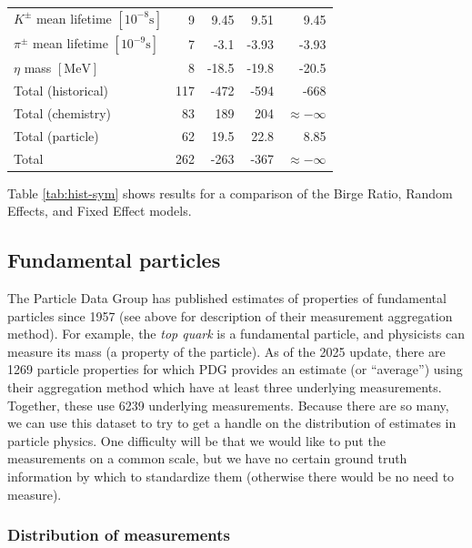 \documentclass[12pt]{article}
\begin{document}
\begin{table}
\begin{tabular}{lrrrr}
  $K^\pm$ mean lifetime $\mathrm{[10^{-8}s]}$ & 9 & 9.45 & 9.51 & 9.45 \\
  $\pi^\pm$ mean lifetime $\mathrm{[10^{-9}s]}$ & 7 & -3.1 & -3.93 & -3.93 \\
  $\eta$ mass $\mathrm{[MeV]}$ & 8 & -18.5 & -19.8 & -20.5 \\\hline
  Total (historical) & 117 & -472 & -594 & -668 \\
  Total (chemistry) & 83 & 189 & 204 & $\approx-\infty$ \\
  Total (particle) & 62 & 19.5 & 22.8 & 8.85 \\\hline
  Total & 262 & -263 & -367 & $\approx-\infty$ \\
  \hline
  \end{tabular}
\end{table}

Table \ref{tab:hist-sym} shows results for a comparison of the Birge Ratio, Random Effects, and Fixed Effect models.

\subsection{Fundamental particles}\label{fundamental-particles}

The Particle Data Group has published estimates of properties of fundamental particles since 1957 (see above for description of their measurement aggregation method). For example, the \emph{top quark} is a fundamental particle, and physicists can measure its mass (a property of the particle). As of the 2025 update, there are 1269 particle properties for which PDG provides an estimate (or ``average'') using their aggregation method which have at least three underlying measurements. Together, these use 6239 underlying measurements. Because there are so many, we can use this dataset to try to get a handle on the distribution of estimates in particle physics. One difficulty will be that we would like to put the measurements on a common scale, but we have no certain ground truth information by which to standardize them (otherwise there would be no need to measure).

\subsubsection{Distribution of measurements}\label{distribution-of-measurements}
\end{document}
